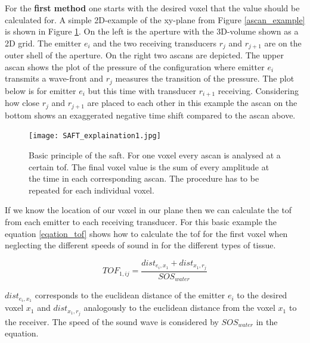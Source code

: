 For the \textbf{first method} one starts with the desired voxel that the value should be calculated for.
A simple 2D-example of the xy-plane from Figure \ref{ascan_example} is shown in Figure \ref{SAFT_explain1}. On the left is the aperture with the 3D-volume shown as a 2D grid. The emitter $e_i$ and the two receiving transducers $r_j$ and $r_{j+1}$ are on the outer shell of the aperture. On the right two \acp{ascan} are depicted. The upper \ac{ascan} shows the plot of the pressure of the configuration where emitter $e_i$ transmits a wave-front and $r_j$ measures the transition of the pressure. The plot below is for emitter $e_i$ but this time with transducer $r_{i+1}$ receiving. Considering how close $r_j$ and $r_{j+1}$ are placed to each other in this example the \ac{ascan} on the bottom shows an exaggerated negative time shift compared to the \ac{ascan} above.

\begin{figure}[H]
    \centering
    \texttt{[image: SAFT\_explaination1.jpg]}
    \caption{Basic principle of the \ac{saft}. For one voxel every \ac{ascan} is analysed at a certain \ac{tof}. The final voxel value is the sum of every amplitude at the time in each corresponding \ac{ascan}. The procedure has to be repeated for each individual voxel. }
    \label{SAFT_explain1}
\end{figure}


If we know the location of our voxel in our plane then we can calculate the \ac{tof} from each emitter to each receiving transducer. For this basic example the equation \ref{eqation_tof} shows how to calculate the \ac{tof} for the first voxel when neglecting the different speeds of sound in for the different types of tissue.

\begin{equation}
TOF_{1,ij} =  \frac{dist_{e_i,x_1} + dist_{x_1,r_{j}} }{ SOS_{water} } 
\label{eqation_tof}
\end{equation}

$dist_{e_i,x_1}$ corresponds to the euclidean distance of the emitter $e_i$ to the desired voxel $x_1$ and $dist_{x_1,r_{j}}$ analogously to the euclidean distance from the voxel $x_1$ to the receiver.
The speed of the sound wave is considered by $SOS_{water}$ in the equation.

